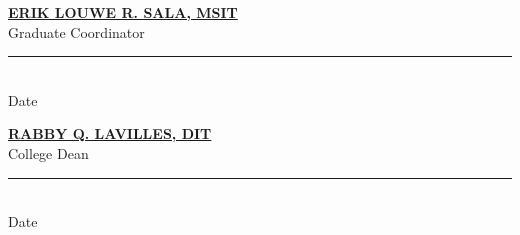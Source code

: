 \vspace{0.3cm}
\begin{center}
	\begin{minipage}{0.53\textwidth}
		\begin{center}
			\textbf{\underline{\MakeUppercase{Erik Louwe R. Sala}, MSIT}}\\
			\vspace{0.1cm}
			Graduate Coordinator\\
			\vspace{0.2cm}
			\rule{4.5cm}{0.5pt}\\
			\vspace{-0.3cm}
			Date
		\end{center}
	\end{minipage}
	\hfill
	\begin{minipage}{0.45\textwidth}
		\begin{center}
			\textbf{\underline{\MakeUppercase{Rabby Q. Lavilles}, DIT}}\\
			\vspace{0.1cm}
			College Dean\\
			\vspace{0.2cm}
			\rule{4.5cm}{0.5pt}\\
			\vspace{-0.3cm}
			Date
		\end{center}
	\end{minipage}
\end{center}